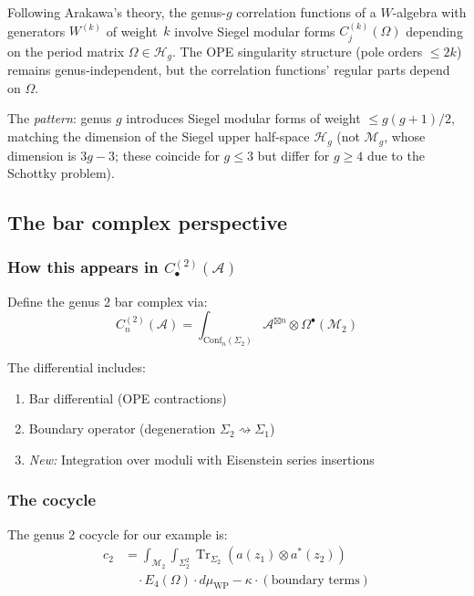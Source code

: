 Following Arakawa's theory, the genus-$g$ correlation functions of a
$W$-algebra with generators $W^{(k)}$ of weight~$k$ involve Siegel modular
forms $C_j^{(k)}(\Omega)$ depending on the period matrix $\Omega \in \mathcal{H}_g$.
The OPE singularity structure (pole orders $\leq 2k$) remains genus-independent,
but the correlation functions' regular parts depend on $\Omega$.

The \emph{pattern}: genus $g$ introduces Siegel modular forms of weight
$\leq g(g+1)/2$, matching the dimension of the Siegel upper half-space
$\mathcal{H}_g$ (not $\mathcal{M}_g$, whose dimension is $3g-3$; these coincide
for $g \leq 3$ but differ for $g \geq 4$ due to the Schottky problem).

\subsection{The bar complex perspective}

\subsubsection{\texorpdfstring{How this appears in $C_{\bullet}^{(2)}(\mathcal{A})$}{How this appears in C-(2)(A)}}

Define the genus 2 bar complex via:
\[C_n^{(2)}(\mathcal{A}) = \int_{\mathrm{Conf}_n(\Sigma_2)}
\mathcal{A}^{\boxtimes n}
\otimes \Omega^{\bullet}(\mathcal{M}_2)\]

The differential includes:
\begin{enumerate}
\item Bar differential (OPE contractions)
\item Boundary operator (degeneration $\Sigma_2 \rightsquigarrow \Sigma_1$)
\item \emph{New:} Integration over moduli with Eisenstein series insertions
\end{enumerate}

\subsubsection{The cocycle}

The genus 2 cocycle for our example is:
\begin{align}
c_2 &= \int_{\mathcal{M}_2} \int_{\Sigma_2^2}
\operatorname{Tr}_{\Sigma_2}(a(z_1) \otimes a^*(z_2)) \\
&\quad \cdot E_4(\Omega) \cdot d\mu_{\text{WP}}
- \kappa \cdot (\text{boundary terms})
\end{align}

